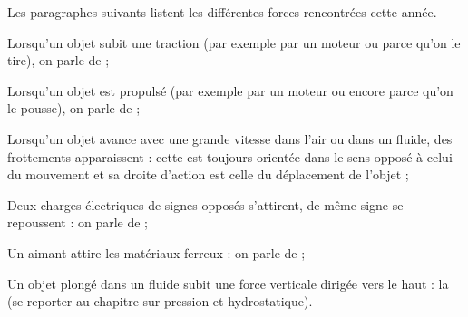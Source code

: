 Les paragraphes suivants listent les différentes forces rencontrées cette année.

\vspace{1em}

Lorsqu'un objet subit une traction (par exemple par un moteur ou parce qu'on le tire), on parle de  ;

\vspace{1em}

Lorsqu'un objet est propulsé (par exemple par un moteur ou encore parce qu'on le pousse), on parle de  ;

\vspace{1em}

Lorsqu'un objet avance avec une grande vitesse dans l'air ou dans un fluide, des frottements apparaissent : cette  est toujours orientée dans le sens opposé à celui du mouvement et sa droite d'action est celle du déplacement de l'objet ; 

\vspace{1em}

Deux charges électriques de signes opposés s'attirent, de même signe se repoussent : on parle de  ;

\vspace{1em}

Un aimant attire les matériaux ferreux : on parle de  ;

\vspace{1em}

Un objet plongé dans un fluide subit une force verticale dirigée vers le haut : la  (se reporter au chapitre sur pression et hydrostatique).










